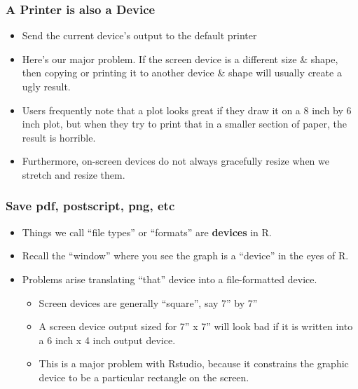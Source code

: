 \documentclass[11pt,english]{beamer}
\begin{document}
\begin{frame}
  \frametitle{A Printer is also a Device}

  \begin{itemize}

  \item Send the current device's output to the default printer



\item Here's our major problem.  If the screen device is a different
  size \& shape, then copying or printing it to another device \&
  shape will usually create a ugly result.

\item Users frequently note that a plot looks great if they draw it on
  a 8 inch by 6 inch plot, but when they try to print that in a
  smaller section of paper, the result is horrible.

  \item Furthermore, on-screen devices do not always gracefully resize
    when we stretch and resize them.

\end{itemize}
\end{frame}

\begin{frame}
  \frametitle{Save pdf, postscript, png, etc}
  \begin{itemize}

  \item Things we call ``file types'' or ``formats'' are \textbf{devices} in R.

  \item Recall the ``window'' where you see the graph is a ``device''
    in the eyes of R.

  \item Problems arise translating ``that'' device into a
    file-formatted device.

    \begin{itemize}
      \item Screen devices are generally ``square'', say 7'' by 7''
      \item  A screen device output sized for 7'' x 7'' will look
      bad if it is written into a 6 inch x 4 inch output device.
      \item This is a major problem with Rstudio, because it
        constrains the graphic device to be a particular rectangle on
        the screen.
    \end{itemize}
  \end{itemize}
\end{frame}
\end{document}
